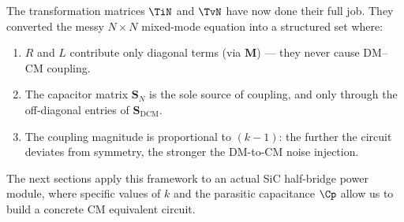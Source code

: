 \begin{physbox}
The transformation matrices $\TiN$ and $\TvN$ have now done their
full job.  They converted the messy $N \times N$ mixed-mode
equation into a structured set where:
\begin{enumerate}
    \item $R$ and $L$ contribute only diagonal terms (via $\mathbf{M}$)
          — they never cause DM--CM coupling.
    \item The capacitor matrix $\mathbf{S}_N$ is the sole source of
          coupling, and only through the off-diagonal entries of
          $\mathbf{S}_{\mathrm{DCM}}$.
    \item The coupling magnitude is proportional to $(k-1)$:
          the further the circuit deviates from symmetry, the stronger
          the DM-to-CM noise injection.
\end{enumerate}
The next sections apply this framework to an actual SiC half-bridge
power module, where specific values of $k$ and the parasitic
capacitance $\Cp$ allow us to build a concrete CM equivalent circuit.
\end{physbox}



